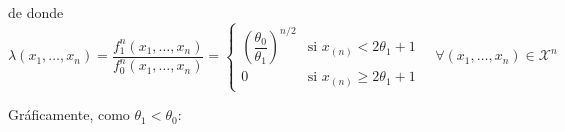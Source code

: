 \documentclass[12pt]{article}
\newcommand{\X}{\mathcal{X}}
\begin{document}
\begin{ejercicio}
        de donde
        $$\lambda(x_1, \ldots, x_n) = \dfrac{f_1^n(x_1, \ldots, x_n)}{f_0^n(x_1, \ldots, x_n)} = 
        \begin{cases} 
            \left( \dfrac{\theta_0}{\theta_1} \right)^{n/2} &\text{si } x_{(n)} < 2\theta_1 + 1 \\ 
            0 &\text{si } x_{(n)} \geq 2\theta_1 + 1 
        \end{cases} \quad \forall (x_1, \ldots, x_n) \in \X^n$$

        Gráficamente, como $\theta_1 < \theta_0$:

        \begin{center}

            \begin{tikzpicture}[x=0.75pt,y=0.75pt,yscale=-1,xscale=1]


\end{tikzpicture}
\end{center}
\end{ejercicio}
\end{document}
